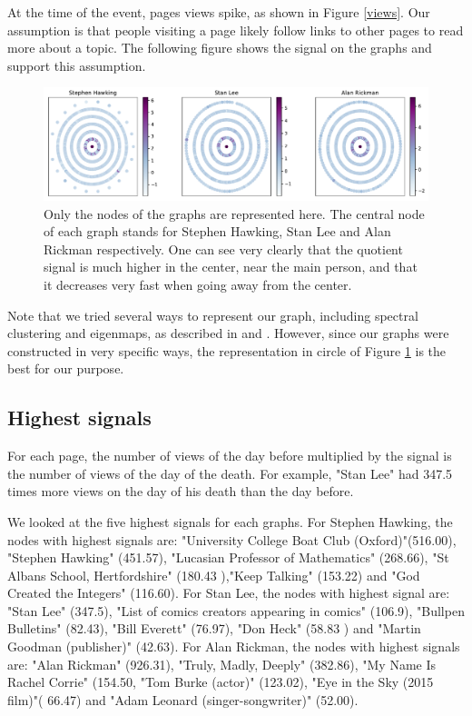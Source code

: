 \documentclass[conference]{IEEEtran}
\begin{document}
\medskip
At the time of the event, pages views spike, as shown in Figure \ref{views}. Our assumption is that people visiting a page likely follow links to other pages to read more about a topic. The following figure shows the signal on the graphs and support this assumption. 

\begin{figure}[!htb] \label{circle}
  \includegraphics[width=\linewidth]{signal_scatter.pdf}
\caption{Only the nodes of the graphs are represented here. The central node of each graph stands for Stephen Hawking, Stan Lee and Alan Rickman respectively. One can see very clearly that the quotient signal is much higher in the center, near the main person, and that it decreases very fast when going away from the center.}
\end{figure}

Note that we tried several ways to represent our graph, including spectral clustering and eigenmaps, as described in \cite{clustering} and \cite{laplacian}. However, since our graphs were constructed in very specific ways, the representation in circle of Figure \ref{circle} is the best for our purpose. 

\subsection{Highest signals}
 For each page, the number of views of the day before multiplied by the signal is the number of views of the day of the death. For example, "Stan Lee" had 347.5 times more views on the day of his death than the day before. 
 
 \medskip
 
We looked at the five highest signals for each graphs. For Stephen Hawking, the nodes with highest signals are: "University College Boat Club (Oxford)"(516.00), 
"Stephen Hawking" (451.57), "Lucasian Professor of Mathematics" (268.66), "St Albans School, Hertfordshire" (180.43 ),"Keep Talking" (153.22) and "God Created the Integers" (116.60).
\newline
For Stan Lee, the nodes with highest signal are:  "Stan Lee" (347.5), "List of comics creators appearing in comics" (106.9), "Bullpen Bulletins" (82.43), "Bill Everett" (76.97), "Don Heck" (58.83 ) and "Martin Goodman (publisher)" (42.63). 
\newline
For Alan Rickman, the nodes with highest signals are: "Alan Rickman" (926.31), "Truly, Madly, Deeply" (382.86), "My Name Is Rachel Corrie" (154.50, "Tom Burke (actor)" (123.02), "Eye in the Sky (2015 film)"( 66.47) and "Adam Leonard (singer-songwriter)" (52.00). 
\end{document}
